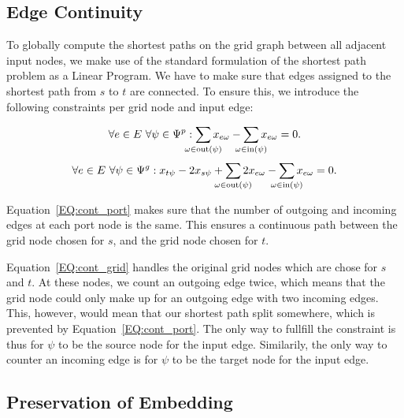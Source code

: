 \documentclass{sig-alternate-sigmod09}
\begin{document}
\subsection{Edge Continuity}

To globally compute the shortest paths on the grid graph between all adjacent input nodes, we make use of the standard formulation of the shortest path problem as a Linear Program.
We have to make sure that edges assigned to the shortest path from $s$ to $t$ are connected.
To ensure this, we introduce the following constraints per grid node and input edge:

\newcommand\Psum[1]{\sum_{\makebox[0pt]{$\scriptstyle#1$}}}

\begin{equation}
  \forall e \in E\ \forall \psi \in \Psi^p: \Psum{\omega \in \text{out}(\psi)} x_{e\omega} - \Psum{\omega \in \text{in}(\psi)} x_{e\omega} = 0. \label{EQ:cont_port}
\end{equation}
\begin{equation}
	\begin{split}
  	\forall e \in E\ \forall \psi \in \Psi^g: x_{t\psi} - 2x_{s\psi} + \Psum{\omega \in \text{out}(\psi)} 2x_{e\omega} - \Psum{\omega \in \text{in}(\psi)} x_{e\omega} = 0. \label{EQ:cont_grid}
  \end{split}
\end{equation}

Equation~\ref{EQ:cont_port} makes sure that the number of outgoing and incoming edges at each port node is the same.
This ensures a continuous path between the grid node chosen for $s$, and the grid node chosen for $t$.

Equation~\ref{EQ:cont_grid} handles the original grid nodes which are chose for $s$ and $t$.
At these nodes, we count an outgoing edge twice, which means that the grid node could only make up for an outgoing edge with two incoming edges.
This, however, would mean that our shortest path split somewhere, which is prevented by Equation~\ref{EQ:cont_port}.
The only way to fullfill the constraint is thus for $\psi$ to be the source node for the input edge.
Similarily, the only way to counter an incoming edge is for $\psi$ to be the target node for the input edge.

\subsection{Preservation of Embedding}
\end{document}

